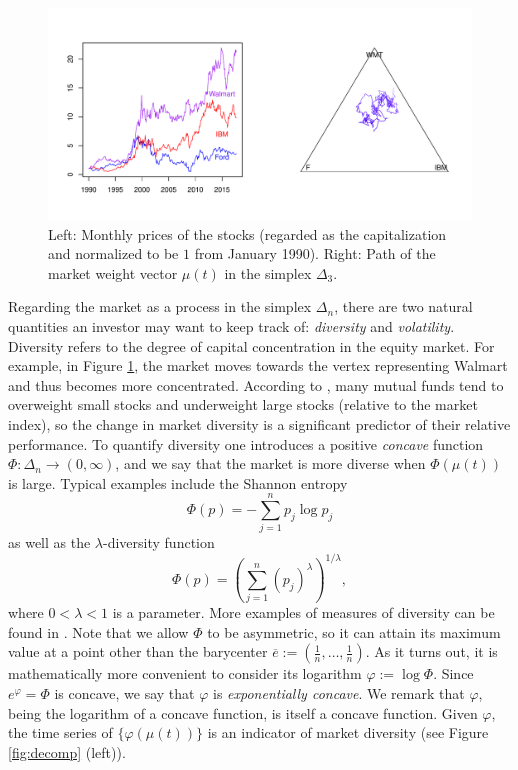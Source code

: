 \documentclass[graybox]{svmult}
\begin{document}
\begin{figure}[t!]
\centering
\includegraphics[scale=0.42]{simplex.pdf}
\caption{Left: Monthly prices of the stocks (regarded as the capitalization and normalized to be $1$ from January 1990). Right: Path of the market weight vector $\mu(t)$ in the simplex $\Delta_3$.} \label{fig:simplex}
\end{figure}

Regarding the market as a process in the simplex $\Delta_n$, there are two natural quantities an investor may want to keep track of: {\it diversity} and {\it volatility}. Diversity refers to the degree of capital concentration in the equity market. For example, in Figure \ref{fig:simplex}, the market moves towards the vertex representing Walmart and thus becomes more concentrated. According to \cite{FGH98}, many mutual funds tend to overweight small stocks and underweight large stocks (relative to the market index), so the change in market diversity is a significant predictor of their relative performance. To quantify diversity one introduces a positive {\it concave} function $\Phi: \Delta_n \rightarrow (0, \infty)$, and we say that the market is more diverse when $\Phi(\mu(t))$ is large. Typical examples include the Shannon entropy
\[
\Phi(p) = - \sum_{j = 1}^n p_j \log p_j
\]
as well as the $\lambda$-diversity function
\begin{equation} \label{eqn:diversity}
\Phi(p) = \left( \sum_{j = 1}^n (p_j)^{\lambda} \right)^{1/\lambda},
\end{equation}
where $0 < \lambda < 1$ is a parameter. More examples of measures of diversity can be found in \cite[Chapter 3]{F02}. Note that we allow $\Phi$ to be asymmetric, so it can attain its maximum value at a point other than the barycenter $\overline{e} := \left(\frac{1}{n}, \ldots, \frac{1}{n}\right)$. As it turns out, it is mathematically more convenient to consider its logarithm $\varphi := \log \Phi$. Since $e^{\varphi} = \Phi$ is concave, we say that $\varphi$ is {\it exponentially concave}. We remark that $\varphi$, being the logarithm of a concave function, is itself a concave function. Given $\varphi$, the time series of $\{\varphi(\mu(t))\}$ is an indicator of market diversity (see Figure \ref{fig:decomp} (left)).
\end{document}
